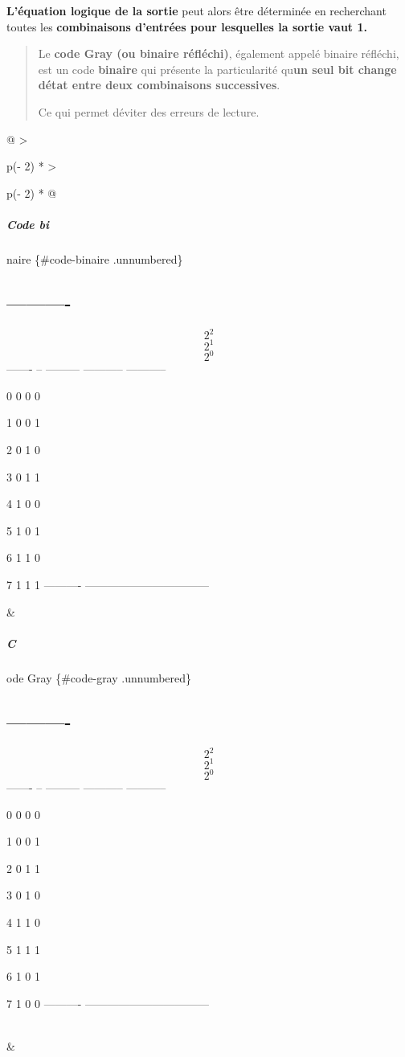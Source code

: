 \textbf{L'équation logique de la sortie} peut alors être déterminée en recherchant toutes les \textbf{combinaisons d'entrées pour lesquelles la sortie vaut 1.}

\begin{quote}
Le \textbf{code Gray (ou binaire réfléchi)}, également appelé binaire réfléchi, est un code \textbf{binaire} qui présente la particularité qu\textquotesingle{}\textbf{un seul bit change d\textquotesingle état entre deux combinaisons successives}.

Ce qui permet d\textquotesingle éviter des erreurs de lecture.
\end{quote}

\begin{longtable}[]{@{}
  >{\raggedright\arraybackslash}p{(\columnwidth - 2\tabcolsep) * }
  >{\raggedright\arraybackslash}p{(\columnwidth - 2\tabcolsep) * }@{}}
\toprule\noalign{}
\begin{minipage}[b]{\linewidth}\raggedright
\hypertarget{code-bi}{%
\subparagraph{Code bi}\label{code-bi}}

naire \{\#code-binaire .unnumbered\}

\hypertarget{section}{%
\subsection{----------}\label{section}}

\[2^{2}\] \[2^{1}\] \[2^{0}\] ------- -- --------- ----------- -----------

0 0 0 0

1 0 0 1

2 0 1 0

3 0 1 1

4 1 0 0

5 1 0 1

6 1 1 0

7 1 1 1 ---------- ---------------------------------
\end{minipage} & \begin{minipage}[b]{\linewidth}\raggedright
\hypertarget{c}{%
\subparagraph{C}\label{c}}

ode Gray \{\#code-gray .unnumbered\}

\hypertarget{section-1}{%
\subsection{----------}\label{section-1}}

\[2^{2}\] \[2^{1}\] \[2^{0}\] ------- -- --------- ----------- -----------

0 0 0 0

1 0 0 1

2 0 1 1

3 0 1 0

4 1 1 0

5 1 1 1

6 1 0 1

7 1 0 0 ---------- ---------------------------------
\end{minipage} \\
\midrule\noalign{}
\endhead
\bottomrule\noalign{}
\endlastfoot
& \\
\end{longtable}

